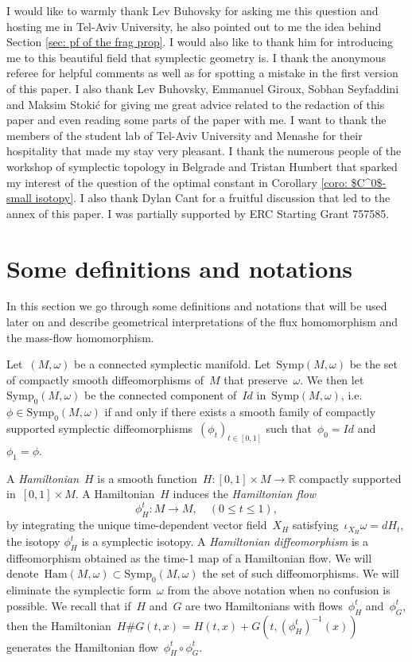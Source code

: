 \documentclass[10pt]{amsart}
\newcommand{\Sympo}{\mathrm{Symp}_{0}}
\newcommand{\Symp}{\mathrm{Symp}}
\begin{document}
I would like to warmly thank Lev Buhovsky for asking me this question and hosting me in Tel-Aviv University, he also pointed out to me the idea behind Section \ref{sec: pf of the frag prop}. I would also like to thank him for introducing me to this beautiful field that symplectic geometry is. I thank
the anonymous referee for helpful comments as well as for spotting a mistake in the first version of this paper. I also thank Lev Buhovsky, Emmanuel Giroux, Sobhan Seyfaddini and Maksim Stoki\'{c} for giving me great advice related to the redaction of this paper and even reading some parts of the paper with me. I want to thank the members of the student lab of Tel-Aviv University and Menashe for their hospitality that made my stay very pleasant. I thank the numerous people of the workshop
of symplectic topology in Belgrade and Tristan Humbert that sparked my interest of the question of the optimal constant in Corollary \ref{coro: $C^0$-small isotopy}. I also thank Dylan Cant for a fruitful discussion that led to the annex of this paper. I was partially supported by ERC Starting Grant 757585.


\section{Some definitions and notations}

In this section we go through some definitions and notations that will be used later on and describe geometrical interpretations of the flux homomorphism and the mass-flow homomorphism.

Let~$(M, \omega)$ be a connected symplectic manifold. Let~$\Symp(M,\omega)$ be the set of compactly smooth diffeomorphisms of~$M$ that preserve~$\omega$. We then let~$\Sympo(M, \omega)$ be the connected component of~$Id$ in~$\Symp(M,\omega)$, i.e.~$\phi \in \Sympo(M,\omega)$ if and only if there exists a smooth family of compactly supported symplectic diffeomorphisms~$\left(\phi_t\right)_{t\in[0,1]}$ such that~$\phi_0=Id$ and~$\phi_1=\phi$.

A \textit{Hamiltonian}~$H$ is a smooth function~$H: [0,1] \times M \rightarrow \mathbb{R}$ compactly supported in~$[0,1]\times M$. A Hamiltonian~$H$ induces the \textit{Hamiltonian flow}
$$\phi_H^t: M\rightarrow M,\quad (0\leq t \leq 1),$$ 
by integrating the unique time-dependent vector field~$X_H$ satisfying~$ \iota_{X_H}\omega=dH_t$, the isotopy $\phi_H^t$ is a symplectic isotopy. A \textit{Hamiltonian diffeomorphism} is a diffeomorphism obtained as the time-1 map of a Hamiltonian flow. We will denote~$\text{Ham}(M,\omega) \subset \Symp_0(M,\omega)$ the set of such diffeomorphisms. We will eliminate the symplectic form~$\omega$ from the above notation when no confusion is possible. We recall that if~$H$ and~$G$ are two Hamiltonians with flows~$\phi_H^t$ and~$\phi_G^t$, then the Hamiltonian~$H \# G(t,x)=H(t,x)+G(t,(\phi_H^t)^{-1}(x))$ generates the Hamiltonian flow~$\phi_H^t \circ \phi_G^t$.
\end{document}
